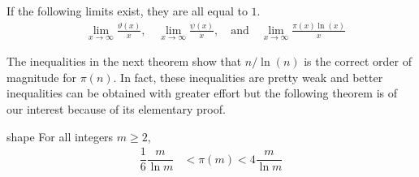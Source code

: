 	\begin{theorem}
		\label{thm:chebyshevestimates}
		If the following limits exist, they are all equal to $1$.
		\begin{align}
			&\lim_{x \to \infty} \frac{\vartheta(x)}{x}, \quad \lim_{x \to \infty} \frac{\psi(x)}{x}, \quad \text{and} \quad
			\lim_{x \to \infty} \frac{\pi(x) \ln(x)}{x} \label{eq:chebyshevestimates:eq1}
		\end{align}
	\end{theorem}


The inequalities in the next theorem show that $n/\ln(n)$ is the correct order of magnitude for $\pi(n)$. In fact, these inequalities are pretty weak and better inequalities can be obtained with greater effort but the following theorem is of our interest because of its elementary proof.

	\begin{theorem}shape
	\label{thm:pi(n)approximation}
		For all integers $m\geq2$,
		\begin{align}
			\dfrac{1}{6}\dfrac{m}{\ln m}
				& <\pi(m)<4\dfrac{m}{\ln m}\label{eq:pi(n)approximation:0}
		\end{align}
	\end{theorem}

